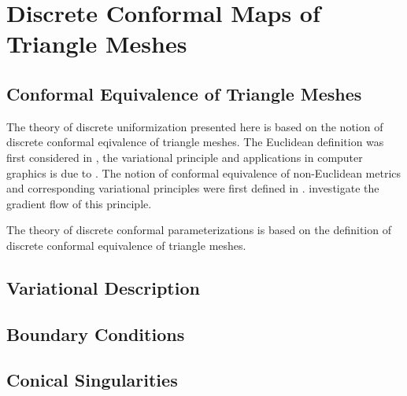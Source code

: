 \documentclass[Thesis.tex]{subfiles}
\begin{document}
\chapter{Discrete Conformal Maps of Triangle Meshes}

\section{Conformal Equivalence of Triangle Meshes}

The theory of discrete uniformization presented here is based on the notion of discrete conformal eqivalence of triangle meshes. The Euclidean definition was first considered in \cite{Luo2004}, the variational principle and applications in computer graphics is due to \cite{Springborn2008, OWF2009, Bobenko2010}. The notion of conformal equivalence of non-Euclidean metrics and corresponding variational principles were first defined in \cite{Bobenko2010}. \cite{Guo2011} investigate the gradient flow of this principle.

The theory of discrete conformal parameterizations is based on the definition of discrete conformal equivalence of triangle meshes.

\begin{definition}

\end{definition}

\section{Variational Description}

\section{Boundary Conditions}

\section{Conical Singularities}


\subfilebibliography
\end{document}
